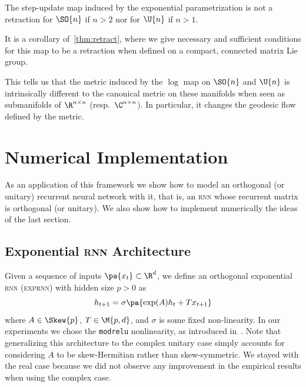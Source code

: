 \begin{proposition}
    The step-update map induced by the exponential parametrization is not a retraction for $\SO{n}$ if $n > 2$ nor for $\U{n}$ if $n > 1$.
\end{proposition}

\begin{demo}
    It is a corollary of~\ref{thm:retract}, where we give necessary and sufficient conditions for this map to be a retraction when defined on a compact, connected matrix Lie group.
\end{demo}

This tells us that the metric induced by the $\log$ map on $\SO{n}$ and $\U{n}$ is intrinsically different to the canonical metric on these manifolds when seen as submanifolds of $\R^{n \times n}$ (resp.\ $\C^{n \times n}$). In particular, it changes the geodesic flow defined by the metric.

\section{Numerical Implementation}\label{sec:exprnn}
As an application of this framework we show how to model an orthogonal (or unitary) recurrent neural network with it, that is, an \textsc{rnn} whose recurrent matrix is orthogonal (or unitary). We also show how to implement numerically the ideas of the last section.

\subsection{Exponential \textsc{rnn} Architecture} Given a sequence of inputs $\pa{x_t} \subset \R^d$, we define an orthogonal exponential \textsc{rnn} (\textsc{exprnn}) with hidden size $p > 0$ as
\[
    h_{t+1} = \sigma\pa{\exp(A) h_t + Tx_{t+1}}
\]
where $A \in \Skew{p}$, $T \in \M{p,d}$, and $\sigma$ is some fixed non-linearity. In our experiments we chose the \texttt{modrelu} nonlinearity, as introduced in~\cite{arjovsky2016unitary}. Note that generalizing this architecture to the complex unitary case simply accounts for considering $A$ to be skew-Hermitian rather than skew-symmetric. We stayed with the real case because we did not observe any improvement in the empirical results when using the complex case.

